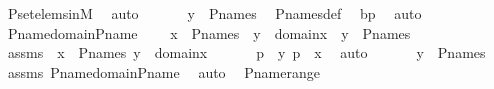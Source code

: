 \begin{isabellebody}
\ P{\isacharunderscore}{\kern0pt}set{\isacharunderscore}{\kern0pt}elems{\isacharunderscore}{\kern0pt}in{\isacharunderscore}{\kern0pt}M\ \isamarkupfalse%
\ auto\ \isanewline
\ \ \isamarkupfalse%
\ \isamarkupfalse%
\ {\isachardoublequoteopen}y\ {\isasymin}\ P{\isacharunderscore}{\kern0pt}names{\isachardoublequoteclose}\ \isamarkupfalse%
\ P{\isacharunderscore}{\kern0pt}names{\isacharunderscore}{\kern0pt}def\ \isamarkupfalse%
\ bp\ \isamarkupfalse%
\ auto\ \isanewline
{}\isamarkupfalse%
%
\endisatagproof
{\isafoldproof}%
%
\isadelimproof
\isanewline
%
\endisadelimproof
\isanewline
{}\isamarkupfalse%
\ P{\isacharunderscore}{\kern0pt}name{\isacharunderscore}{\kern0pt}domain{\isacharunderscore}{\kern0pt}P{\isacharunderscore}{\kern0pt}name{\isacharprime}{\kern0pt}\ {\isacharcolon}{\kern0pt}\ \isanewline
\ \ {\isachardoublequoteopen}x\ {\isasymin}\ P{\isacharunderscore}{\kern0pt}names\ {\isasymLongrightarrow}\ y\ {\isasymin}\ domain{\isacharparenleft}{\kern0pt}x{\isacharparenright}{\kern0pt}\ {\isasymLongrightarrow}\ y\ {\isasymin}\ P{\isacharunderscore}{\kern0pt}names{\isachardoublequoteclose}\ \isanewline
%
\isadelimproof
%
\endisadelimproof
%
\isatagproof
{}\isamarkupfalse%
\ {\isacharminus}{\kern0pt}\ \isanewline
\ \ \isamarkupfalse%
\ assms\ {\isacharcolon}{\kern0pt}\ {\isachardoublequoteopen}x\ {\isasymin}\ P{\isacharunderscore}{\kern0pt}names{\isachardoublequoteclose}\ {\isachardoublequoteopen}y\ {\isasymin}\ domain{\isacharparenleft}{\kern0pt}x{\isacharparenright}{\kern0pt}{\isachardoublequoteclose}\ \isanewline
\ \ \isamarkupfalse%
\ \isamarkupfalse%
\ p\ \ {\isachardoublequoteopen}{\isacharless}{\kern0pt}y{\isacharcomma}{\kern0pt}\ p{\isachargreater}{\kern0pt}\ {\isasymin}\ x{\isachardoublequoteclose}\ \isamarkupfalse%
\ auto\ \isanewline
\ \ \isamarkupfalse%
\ \isamarkupfalse%
\ {\isachardoublequoteopen}y\ {\isasymin}\ P{\isacharunderscore}{\kern0pt}names\ {\isachardoublequoteclose}\ \isamarkupfalse%
\ assms\ P{\isacharunderscore}{\kern0pt}name{\isacharunderscore}{\kern0pt}domain{\isacharunderscore}{\kern0pt}P{\isacharunderscore}{\kern0pt}name\ \isamarkupfalse%
\ auto\ \isanewline
{}\isamarkupfalse%
%
\endisatagproof
{\isafoldproof}%
%
\isadelimproof
\isanewline
%
\endisadelimproof
\isanewline
{}\isamarkupfalse%
\ P{\isacharunderscore}{\kern0pt}name{\isacharunderscore}{\kern0pt}range\ {\isacharcolon}{\kern0pt}\ \isanewline

\end{isabellebody}

